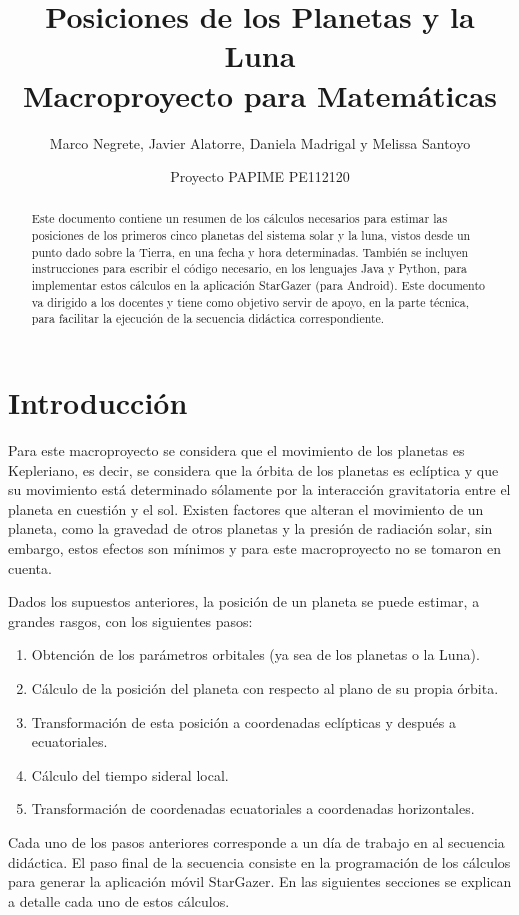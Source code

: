 \documentclass[a4paper,10pt]{article}
\title{Posiciones de los Planetas y la Luna \\ Macroproyecto para Matemáticas}
\author{Marco Negrete, Javier Alatorre, Daniela Madrigal y Melissa Santoyo}
\date{Proyecto PAPIME PE112120}
\begin{document}
\renewcommand{\tablename}{Tabla}
\renewcommand{\BOthers}[1]{et al.\hbox{}}
\maketitle

\begin{abstract}
  Este documento contiene un resumen de los cálculos necesarios para estimar las posiciones de los primeros cinco planetas del sistema solar y la luna, vistos desde un punto dado sobre la Tierra, en una fecha y hora determinadas. También se incluyen instrucciones para escribir el código necesario, en los lenguajes Java y Python, para implementar estos cálculos en la aplicación StarGazer (para Android). Este documento va dirigido a los docentes y tiene como objetivo servir de apoyo, en la parte técnica, para facilitar la ejecución de la secuencia didáctica correspondiente. 
\end{abstract}

\section{Introducción}
Para este macroproyecto se considera que el movimiento de los planetas es Kepleriano, es decir, se considera que la órbita de los planetas es eclíptica y que su movimiento está determinado sólamente por la interacción gravitatoria entre el planeta en cuestión y el sol. Existen factores que alteran el movimiento de un planeta, como la gravedad de otros planetas y la presión de radiación solar, sin embargo, estos efectos son mínimos y para este macroproyecto no se tomaron en cuenta. 

Dados los supuestos anteriores, la posición de un planeta se puede estimar, a grandes rasgos, con los siguientes pasos:
\begin{enumerate}
\item Obtención de los parámetros orbitales (ya sea de los planetas o la Luna).
\item Cálculo de la posición del planeta con respecto al plano de su propia órbita.
\item Transformación de esta posición a coordenadas eclípticas y después a ecuatoriales.
\item Cálculo del tiempo sideral local.
\item Transformación de coordenadas ecuatoriales a coordenadas horizontales.
\end{enumerate}

Cada uno de los pasos anteriores corresponde a un día de trabajo en al secuencia didáctica. El paso final de la secuencia consiste en la programación de los cálculos para generar la aplicación móvil StarGazer. En las siguientes secciones se explican a detalle cada uno de estos cálculos.
\end{document}
